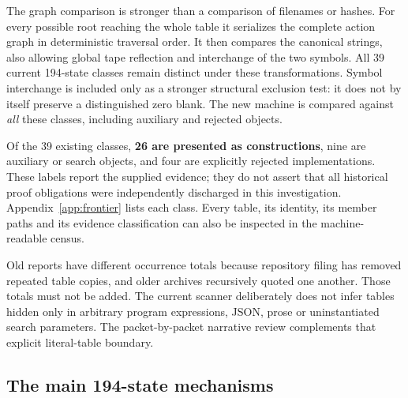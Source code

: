 The graph comparison is stronger than a comparison of filenames or hashes.
For every possible root reaching the whole table it serializes the complete
action graph in deterministic traversal order. It then compares the
canonical strings, also allowing global tape reflection and interchange of
the two symbols. All 39 current 194-state classes remain distinct under
these transformations. Symbol interchange is included only as a stronger
structural exclusion test: it does not by itself preserve a distinguished
zero blank. The new machine is compared against \emph{all} these classes,
including auxiliary and rejected objects.

Of the 39 existing classes, \textbf{26 are presented as constructions},
nine are auxiliary or search objects, and four are explicitly rejected
implementations. These labels report the supplied evidence; they do not
assert that all historical proof obligations were independently discharged
in this investigation. Appendix~\ref{app:frontier} lists each class. Every
table, its identity, its member paths and its evidence classification can
also be inspected in the machine-readable census.

Old reports have different occurrence totals because repository filing has
removed repeated table copies, and older archives recursively quoted one
another. Those totals must not be added. The current scanner deliberately
does not infer tables hidden only in arbitrary program expressions, JSON,
prose or uninstantiated search parameters. The packet-by-packet narrative
review complements that explicit literal-table boundary.

\subsection{The main 194-state mechanisms}

